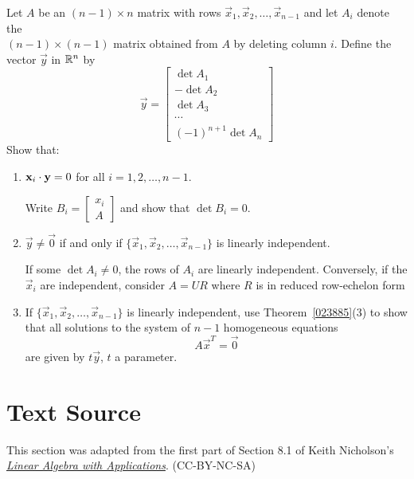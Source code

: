 \documentclass{ximera}
\begin{document}
\begin{problem}
Let $A$ be an $(n - 1) \times n$ matrix with rows $\vec{x}_{1}, \vec{x}_{2}, \dots, \vec{x}_{n-1}$ and let $A_{i}$ denote the \\ $(n - 1) \times (n - 1)$ matrix obtained from $A$ by deleting column $i$. Define the vector $\vec{y}$ in $\mathbb{R}^n$ by \begin{equation*}
\vec{y} = \begin{bmatrix}
\det A_{1} \\ -\det A_{2} \\ \det A_{3} \\ \cdots \\ (-1)^{n+1} \det A_{n}
\end{bmatrix}
\end{equation*} Show that:


\begin{enumerate}[label={\alph*.}]
\item $\mathbf{x}_{i} \cdot \mathbf{y} = 0$ for all $i = 1, 2, \dots , n - 1$. 
\begin{hint}
Write $B_{i} = \begin{bmatrix}
x_{i} \\ A
\end{bmatrix}$
and show that $\det B_{i} = 0$.
\end{hint}

\item $\vec{y} \neq \vec{0}$ if and only if $\{\vec{x}_{1}, \vec{x}_{2}, \dots , \vec{x}_{n-1}\}$ is linearly independent.
\begin{hint}
If some $\det A_{i} \neq 0$, the rows of $A_{i}$ are linearly independent. Conversely, if the $\vec{x}_{i}$ are independent, consider $A = UR$ where $R$ is in reduced row-echelon form
\end{hint}

\item If $\{\vec{x}_{1}, \vec{x}_{2}, \dots , \vec{x}_{n-1}\}$ is linearly independent, use Theorem~\ref{023885}(3) to show that all solutions to the system of $n - 1$ homogeneous equations
\begin{equation*}
A\vec{x}^T = \vec{0}
\end{equation*}
are given by $t\vec{y}$, $t$ a parameter.

\end{enumerate}
\end{problem}

\section*{Text Source} This section was adapted from the first part of Section 8.1 of Keith Nicholson's \href{https://open.umn.edu/opentextbooks/textbooks/linear-algebra-with-applications}{\it Linear Algebra with Applications}. (CC-BY-NC-SA)
\end{document}
